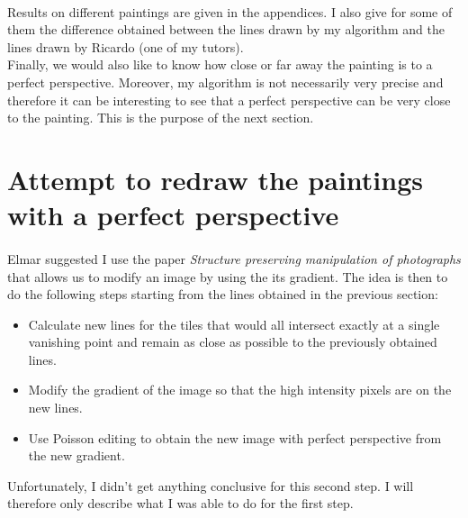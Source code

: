 \documentclass[11pt]{article}
\begin{document}
	\paragraph{}
	Results on different paintings are given in the appendices. I also give for some of them the difference obtained between the lines drawn by my algorithm and the lines drawn by Ricardo (one of my tutors). \\
	Finally, we would also like to know how close or far away the painting is to a perfect perspective. Moreover, my algorithm is not necessarily very precise and therefore it can be interesting to see that a perfect perspective can be very close to the painting. This is the purpose of the next section. 

	\section{Attempt to redraw the paintings with a perfect perspective}
	
	\paragraph{}
	Elmar suggested I use the paper \textit{Structure preserving manipulation of photographs} \cite{redraw} that allows us to modify an image by using the its gradient. The idea is then to do the following steps starting from the lines obtained in the previous section:
	\begin{itemize}
		\item Calculate new lines for the tiles that would all intersect exactly at a single vanishing point and remain as close as possible to the previously obtained lines.
		\item Modify the gradient of the image so that the high intensity pixels are on the new lines.
		\item Use Poisson editing \cite{poisson} to obtain the new image with perfect perspective from the new gradient.
	\end{itemize}
	Unfortunately, I didn't get anything conclusive for this second step. I will therefore only describe what I was able to do for the first step.
	
\end{document}
